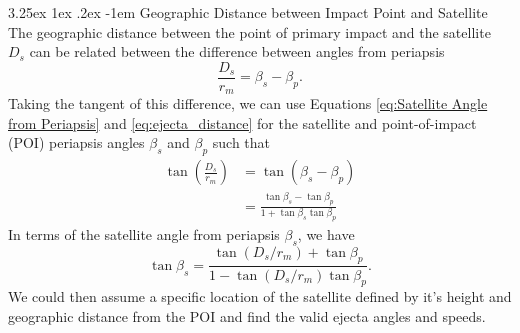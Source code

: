\documentclass{hitec}
\makeatletter
\numberwithin{equation}{section}
\renewcommand\paragraph{\@startsection{paragraph}{5}{\z@}%
	{3.25ex \@plus1ex \@minus.2ex}%
	{-1em}%
	{\normalfont\normalsize\bfseries}}
\makeatother
\begin{document}
\paragraph{Geographic Distance between Impact Point and Satellite}
The geographic distance between the point of primary impact and the satellite $D_s$ can be related between the difference between angles from periapsis
\begin{equation}
\frac{D_s}{r_m} = \beta_s - \beta_p.
\end{equation}
Taking the tangent of this difference, we can use Equations \eqref{eq:Satellite Angle from Periapsis} and \eqref{eq:ejecta_distance} for the satellite and point-of-impact (POI) periapsis angles $\beta_s$ and $\beta_p$ such that
\begin{align}
\tan\left(\frac{D_s}{r_m}\right) &= \tan(\beta_s - \beta_p)\nonumber\\
&= \frac{\tan\beta_s - \tan\beta_p}{1 + \tan\beta_s\tan\beta_p}
\end{align}
In terms of the satellite angle from periapsis $\beta_s$, we have
\begin{equation}
\tan\beta_s = \frac{\tan(D_s/r_m) + \tan\beta_p}{1 - \tan(D_s/r_m)\tan\beta_p}.
\end{equation}
We could then assume a specific location of the satellite defined by it's height and geographic distance from the POI and find the valid ejecta angles and speeds.




\cleardoublepage
{}
{}


\end{document}
